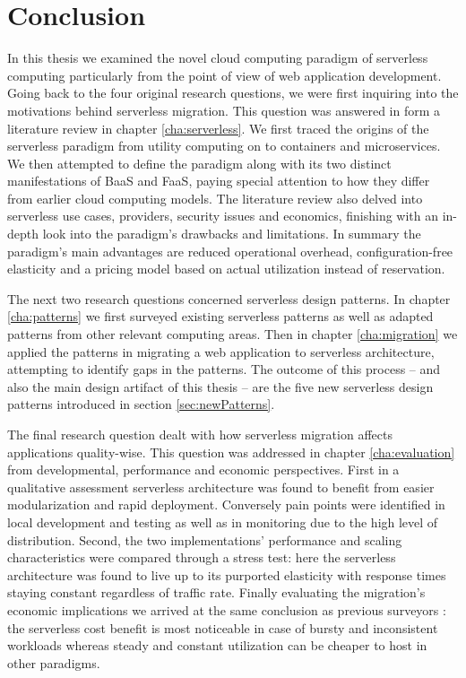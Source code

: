 \chapter{Conclusion}


In this thesis we examined the novel cloud computing paradigm of serverless computing particularly from the point of view of web application development. Going back to the four original research questions, we were first inquiring into the motivations behind serverless migration. This question was answered in form a literature review in chapter \ref{cha:serverless}. We first traced the origins of the serverless paradigm from utility computing on to containers and microservices. We then attempted to define the paradigm along with its two distinct manifestations of BaaS and FaaS, paying special attention to how they differ from earlier cloud computing models. The literature review also delved into serverless use cases, providers, security issues and economics, finishing with an in-depth look into the paradigm's drawbacks and limitations. In summary the paradigm's main advantages are reduced operational overhead, configuration-free elasticity and a pricing model based on actual utilization instead of reservation.

The next two research questions concerned serverless design patterns. In chapter \ref{cha:patterns} we first surveyed existing serverless patterns as well as adapted patterns from other relevant computing areas. Then in chapter \ref{cha:migration} we applied the patterns in migrating a web application to serverless architecture, attempting to identify gaps in the patterns. The outcome of this process -- and also the main design artifact of this thesis -- are the five new serverless design patterns introduced in section \ref{sec:newPatterns}.

The final research question dealt with how serverless migration affects applications quality-wise. This question was addressed in chapter \ref{cha:evaluation} from developmental, performance and economic perspectives. First in a qualitative assessment serverless  architecture was found to benefit from easier modularization and rapid deployment. Conversely pain points were identified in local development and testing as well as in monitoring due to the high level of distribution. Second, the two implementations' performance and scaling characteristics were compared through a stress test: here the serverless architecture was found to live up to its purported elasticity with response times staying constant regardless of traffic rate. Finally evaluating the migration's economic implications we arrived at the same conclusion as previous surveyors \parencite[e.g.][]{baldini17currentTrends}: the serverless cost benefit is most noticeable in case of bursty and inconsistent workloads whereas steady and constant utilization can be cheaper to host in other paradigms.

